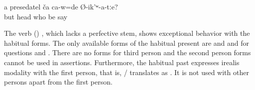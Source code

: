  
\begin{exe}
	
	\ex	\label{ex:Who did you say was the head}
	\gll	a	presedatel	ča 	ca-w=de	Ø-ik'ʷ-a-tːe?\\
		but	head	who	be	say\\
	\glt	{}
\end{exe}

The verb  () , which lacks a perfective stem, shows exceptional behavior with the habitual forms. The only available forms of the habitual present are   and   and for questions   and  . There are no forms for third person and the second person forms cannot be used in assertions. Furthermore, the habitual past expresses irealis modality with the first person, that is,  /  translates as . It is not used with other persons apart from the first person.



